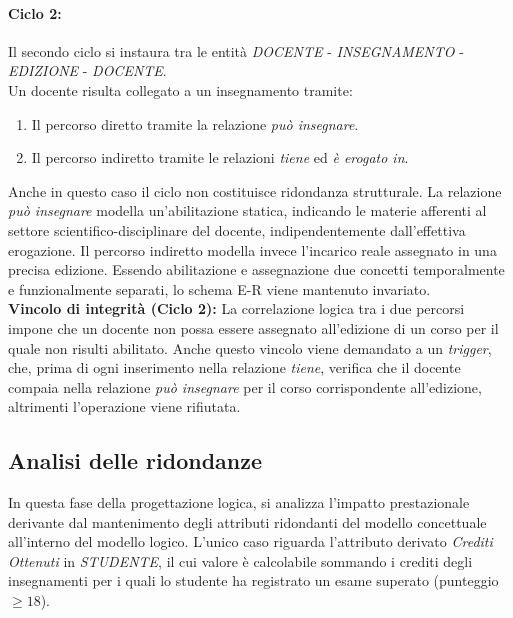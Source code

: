 \paragraph{Ciclo 2:}
Il secondo ciclo si instaura tra le entità \textit{DOCENTE} - \textit{INSEGNAMENTO} - \textit{EDIZIONE} - \mbox{\textit{DOCENTE}}. \\

\noindent
Un docente risulta collegato a un insegnamento tramite:

\begin{enumerate}
    \item Il percorso diretto tramite la relazione \textit{può insegnare}.
    \item Il percorso indiretto tramite le relazioni \textit{tiene} ed \textit{è erogato in}.
\end{enumerate}

\noindent
Anche in questo caso il ciclo non costituisce ridondanza strutturale. 
La relazione \textit{può insegnare} modella un'abilitazione statica, 
indicando le materie afferenti al settore scientifico-disciplinare del docente, 
indipendentemente dall'effettiva erogazione. 
Il percorso indiretto modella invece l'incarico reale assegnato in una precisa edizione. 
Essendo abilitazione e assegnazione due concetti temporalmente e funzionalmente separati, 
lo schema E-R viene mantenuto invariato. \\

\noindent
\textbf{Vincolo di integrità (Ciclo 2):} La correlazione logica tra i 
due percorsi impone che un docente non possa essere assegnato 
all'edizione di un corso per il quale non risulti abilitato. 
Anche questo vincolo viene demandato a un \textit{trigger}, che, prima di 
ogni inserimento nella relazione \textit{tiene},
verifica che il docente compaia nella relazione \textit{può insegnare} 
per il corso corrispondente all'edizione, altrimenti l'operazione viene rifiutata.

\subsection{Analisi delle ridondanze}

In questa fase della progettazione logica, si analizza l'impatto prestazionale 
derivante dal mantenimento degli attributi ridondanti 
del modello concettuale all'interno del modello logico. 
L'unico caso riguarda l'attributo derivato \textit{Crediti Ottenuti} in \textit{STUDENTE},  
il cui valore è calcolabile sommando i crediti degli insegnamenti 
per i quali lo studente ha registrato un esame superato (punteggio $\geq 18$). \\

